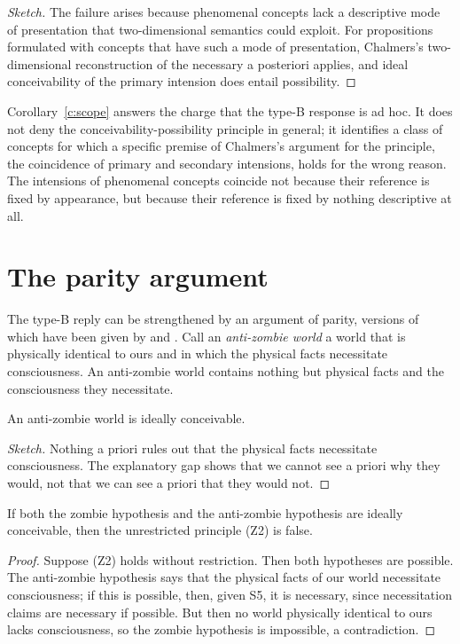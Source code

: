 \documentclass{situationist-preprint}
\begin{document}
\begin{proof}[Sketch]
The failure arises because phenomenal concepts lack a descriptive mode of presentation that two-dimensional semantics could exploit. For propositions formulated with concepts that have such a mode of presentation, Chalmers's two-dimensional reconstruction of the necessary a posteriori applies, and ideal conceivability of the primary intension does entail possibility.
\end{proof}

Corollary~\ref{c:scope} answers the charge that the type-B response is ad hoc. It does not deny the conceivability-possibility principle in general; it identifies a class of concepts for which a specific premise of Chalmers's argument for the principle, the coincidence of primary and secondary intensions, holds for the wrong reason. The intensions of phenomenal concepts coincide not because their reference is fixed by appearance, but because their reference is fixed by nothing descriptive at all.

\section{The parity argument}

The type-B reply can be strengthened by an argument of parity, versions of which have been given by \citet{Frankish2007} and \citet{Brown2010}. Call an \emph{anti-zombie world} a world that is physically identical to ours and in which the physical facts necessitate consciousness. An anti-zombie world contains nothing but physical facts and the consciousness they necessitate.

\begin{lemma}\label{l:anti}
An anti-zombie world is ideally conceivable.
\end{lemma}

\begin{proof}[Sketch]
Nothing a priori rules out that the physical facts necessitate consciousness. The explanatory gap shows that we cannot see a priori why they would, not that we can see a priori that they would not.
\end{proof}

\begin{proposition}\label{p:parity}
If both the zombie hypothesis and the anti-zombie hypothesis are ideally conceivable, then the unrestricted principle (Z2) is false.
\end{proposition}

\begin{proof}
Suppose (Z2) holds without restriction. Then both hypotheses are possible. The anti-zombie hypothesis says that the physical facts of our world necessitate consciousness; if this is possible, then, given S5, it is necessary, since necessitation claims are necessary if possible. But then no world physically identical to ours lacks consciousness, so the zombie hypothesis is impossible, a contradiction.
\end{proof}
\end{document}
